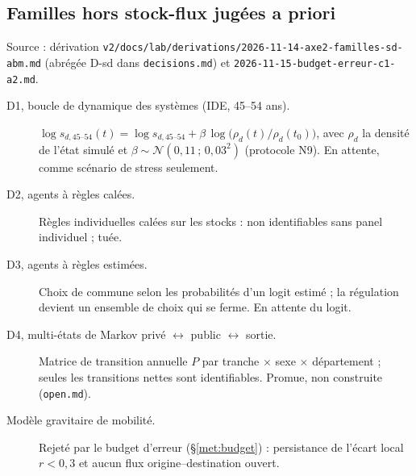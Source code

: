 \subsection{Familles hors stock-flux jugées a priori}
\label{met:horssf}
Source : dérivation \texttt{v2/docs/lab/derivations/2026-11-14-axe2-familles-sd-abm.md} (abrégée D-sd
dans \texttt{decisions.md}) et \texttt{2026-11-15-budget-erreur-c1-a2.md}.
\begin{description}
  \item[D1, boucle de dynamique des systèmes (IDE, 45--54 ans).]
    $\log s_{d,45\text{--}54}(t) = \log s_{d,45\text{--}54} + \beta\,\log\big(\rho_d(t)/\rho_d(t_0)\big)$, avec
    $\rho_d$ la densité de l'état simulé et $\beta \sim \mathcal N(0{,}11\,;\,0{,}03^2)$ (protocole N9). En
    attente, comme scénario de stress seulement.
  \item[D2, agents à règles calées.] Règles individuelles calées sur les stocks : non identifiables sans panel
    individuel ; tuée.
  \item[D3, agents à règles estimées.] Choix de commune selon les probabilités d'un logit estimé ; la
    régulation devient un ensemble de choix qui se ferme. En attente du logit.
  \item[D4, multi-états de Markov privé $\leftrightarrow$ public $\leftrightarrow$ sortie.] Matrice de
    transition annuelle $P$ par tranche $\times$ sexe $\times$ département ; seules les transitions nettes
    sont identifiables. Promue, non construite (\texttt{open.md}).
  \item[Modèle gravitaire de mobilité.] Rejeté par le budget d'erreur (\S\ref{met:budget}) : persistance
    de l'écart local $r < 0{,}3$ et aucun flux origine--destination ouvert.
\end{description}


